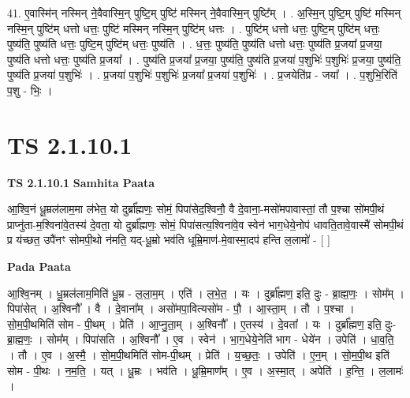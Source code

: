\documentclass[17pt]{extarticle}
\begin{document}
41. ए॒वास्मि॑न् नस्मिन् ने॒वैवास्मि॒न् पुष्टि॒म् पुष्टि॑ मस्मिन् ने॒वैवास्मि॒न् पुष्टि᳚म् । . अ॒स्मि॒न् पुष्टि॒म् पुष्टि॑ मस्मिन् नस्मि॒न् पुष्टि॑म् धत्तो धत्तः॒ पुष्टि॑ मस्मिन् नस्मि॒न् पुष्टि॑म् धत्तः । . पुष्टि॑म् धत्तो धत्तः॒ पुष्टि॒म् पुष्टि॑म् धत्तः॒ पुष्य॑ति॒ पुष्य॑ति धत्तः॒ पुष्टि॒म् पुष्टि॑म् धत्तः॒ पुष्य॑ति । . ध॒त्तः॒ पुष्य॑ति॒ पुष्य॑ति धत्तो धत्तः॒ पुष्य॑ति प्र॒जया᳚ प्र॒जया॒ पुष्य॑ति धत्तो धत्तः॒ पुष्य॑ति प्र॒जया᳚ । . पुष्य॑ति प्र॒जया᳚ प्र॒जया॒ पुष्य॑ति॒ पुष्य॑ति प्र॒जया॑ प॒शुभिः॑ प॒शुभिः॑ प्र॒जया॒ पुष्य॑ति॒ पुष्य॑ति प्र॒जया॑ प॒शुभिः॑ । . प्र॒जया॑ प॒शुभिः॑ प॒शुभिः॑ प्र॒जया᳚ प्र॒जया॑ प॒शुभिः॑ । . प्र॒जयेति॑प्र - जया᳚ । . प॒शुभि॒रिति॑ प॒शु - भिः॒ । \newline
\pagebreak
{}

\section{ TS 2.1.10.1 }

\textbf{TS 2.1.10.1 } \newline
\textbf{Samhita Paata} \newline

आ॒श्वि॒नं धू॒म्रल॑लाम॒मा ल॑भेत॒ यो दुर्ब्रा᳚ह्मणः॒ सोमं॒ पिपा॑सेद॒श्विनौ॒ वै दे॒वाना॒-मसो॑मपावास्तां॒ तौ प॒श्चा सो॑मपी॒थं प्राप्नु॑ता-म॒श्विना॑वे॒तस्य॑ दे॒वता॒ यो दुर्ब्रा᳚ह्मणः॒ सोमं॒ पिपा॑सत्य॒श्विना॑वे॒व स्वेन॑ भाग॒धेये॒नोप॑ धावति॒तावे॒वास्मै॑ सोमपी॒थं प्र य॑च्छत॒ उपै॑नꣳ सोमपी॒थो न॑मति॒ यद्-धू॒म्रो भव॑ति धूम्रि॒माण॑-मे॒वास्मा॒दप॑ हन्ति ल॒लामो॑ - [  ] \newline

\textbf{Pada Paata} \newline

आ॒श्वि॒नम् । धू॒म्रल॑लाम॒मिति॑ धू॒म्र - ल॒ला॒म॒म् । एति॑ । ल॒भे॒त॒ । यः । दुर्ब्रा᳚ह्मण॒ इति॒ दुः - ब्रा॒ह्म॒णः॒ । सोम᳚म् । पिपा॑सेत् । अ॒श्विनौ᳚ । वै । दे॒वाना᳚म् । असो॑मपा॒वित्यसो॑म - पौ॒ । आ॒स्ता॒म् । तौ । प॒श्चा । सो॒म॒पी॒थमिति॑ सोम - पी॒थम् । प्रेति॑ । आ॒प्नु॒ता॒म् । अ॒श्विनौ᳚ । ए॒तस्य॑ । दे॒वता᳚ । यः । दुर्ब्रा᳚ह्मण॒ इति॒ दुः- ब्रा॒ह्म॒णः॒ । सोम᳚म् । पिपा॑सति । अ॒श्विनौ᳚ । ए॒व । स्वेन॑ । भा॒ग॒धेये॒नेति॑ भाग - धेये॑न । उपेति॑ । धा॒व॒ति॒ । तौ । ए॒व । अ॒स्मै॒ । सो॒म॒पी॒थमिति॑ सोम-पी॒थम् । प्रेति॑ । य॒च्छ॒तः॒ । उपेति॑ । ए॒न॒म् । सो॒म॒पी॒थ इति॑ सोम - पी॒थः । न॒म॒ति॒ । यत् । धू॒म्रः । भव॑ति । धू॒म्रि॒माण᳚म् । ए॒व । अ॒स्मा॒त् । अपेति॑ । ह॒न्ति॒ । ल॒लामः॑ ।  \newline
\end{document}
